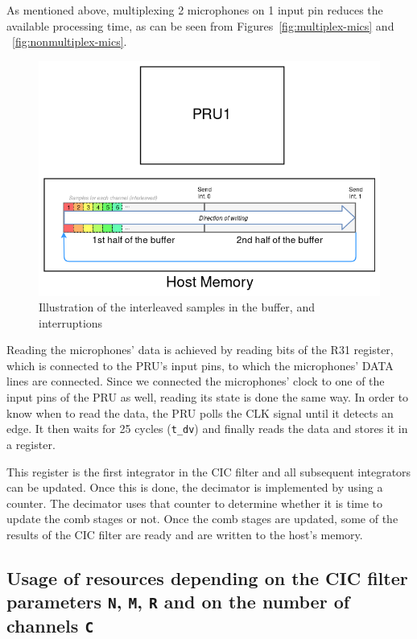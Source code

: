 \documentclass[]{report}
\begin{document}
As mentioned above, multiplexing 2 microphones on 1 input pin reduces
the available processing time, as can be seen from Figures~\ref{fig:multiplex-mics} and ~\ref{fig:nonmultiplex-mics}.

\begin{figure}
\centering
\includegraphics[width=0.8\linewidth]{Pictures/PRU_buffer.png}
\caption{Illustration of the interleaved samples in the buffer, and
interruptions}
\end{figure}

Reading the microphones' data is achieved by reading bits of the R31 register, which is connected to the PRU's input pins, to which the microphones' DATA lines are connected. Since we connected the microphones' clock to one of the input pins of the PRU as well, reading its state is done the same way. In order to know when to read the data, the PRU polls the CLK signal until it detects an edge. It then waits for 25 cycles (\texttt{t\_dv}) and finally reads the data and stores it in a register.

This register is the first integrator in the CIC filter and all subsequent integrators can be updated. Once this is done, the decimator is implemented by using a counter. The decimator uses that counter to determine whether it is time to update the comb stages or not. Once the comb stages are updated, some of the results of the CIC filter are ready and are written to the host's memory.

\hypertarget{usage-of-resources-depending-on-the-cic-filter-parameters-n-m-r-and-on-the-number-of-channels-c}{%
\subsection{\texorpdfstring{Usage of resources depending on the CIC
filter parameters \texttt{N}, \texttt{M}, \texttt{R} and on the number
of channels
\texttt{C}}{Usage of resources depending on the CIC filter parameters N, M, R and on the number of channels C}}\label{usage-of-resources-depending-on-the-cic-filter-parameters-n-m-r-and-on-the-number-of-channels-c}}
\end{document}
